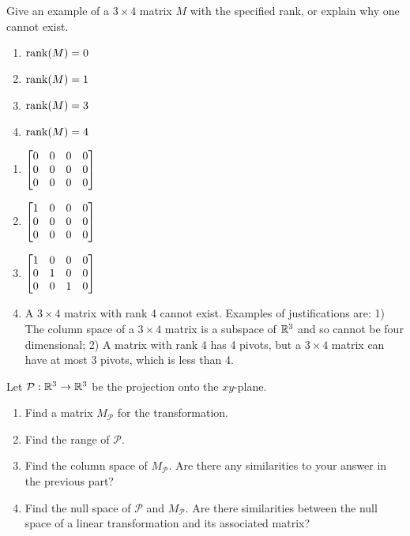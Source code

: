 \begin{exercises}
\begin{problist}
		\prob Give an example of a $3\times4$ matrix $M$ with the specified rank,
		or explain why one cannot exist.
		\begin{enumerate}
			\item $\operatorname{rank}(M) = 0$

			\item $\operatorname{rank}(M) = 1$

			\item $\operatorname{rank}(M) = 3$

			\item $\operatorname{rank}(M) = 4$
		\end{enumerate}

		\begin{solution}
			\begin{enumerate}
				\item $\mat{0&0&0&0\\0&0&0&0\\0&0&0&0}$

				\item $\mat{1&0&0&0\\0&0&0&0\\0&0&0&0}$

				\item $\mat{1&0&0&0\\0&1&0&0\\0&0&1&0}$

				\item A $3\times4$ matrix with rank 4 cannot exist. Examples of
					justifications are: 1) The column space of a $3\times 4$
					matrix is a subspace of $\mathbb{R}^{3}$ and so cannot be four
					dimensional; 2) A matrix with rank 4 has 4 pivots, but a $3\times
					4$ matrix can have at most 3 pivots, which is less than 4.
			\end{enumerate}
		\end{solution}

		\prob Let $\mathcal{P}:\mathbb{R}^{3}\to\mathbb{R}^{3}$ be the projection onto the $xy$-plane.
		\begin{enumerate}
			\item Find a matrix $M_{\mathcal{P}}$ for the transformation.

			\item Find the range of $\mathcal{P}$.

			\item Find the column space of $M_{\mathcal{P}}$. Are there any
				similarities to your answer in the previous part?

			\item Find the null space of $\mathcal{P}$ and $M_{\mathcal{P}}$.
				Are there similarities between the null space of a linear
				transformation and its associated matrix?
		\end{enumerate}


\end{problist}
\end{exercises}
